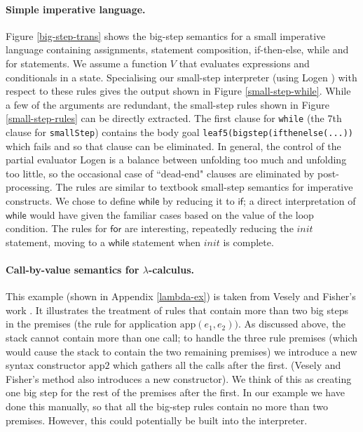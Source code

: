 \documentclass{llncs}
\newcommand{\keyword}[1]{\mathsf{#1}}
\begin{document}
\paragraph{Simple imperative language.} 
Figure \ref{big-step-trans} shows the big-step semantics for a small imperative language containing assignments, statement composition,
if-then-else, while and for statements.  We assume a function $V$ that evaluates expressions and conditionals in a state.  
Specialising our small-step interpreter (using {\sc  Logen} \cite{Logen}) with respect to these rules gives the output shown in Figure \ref{small-step-while}. 
While a few of the
arguments are redundant, the small-step rules shown in Figure \ref{small-step-rules} can be directly extracted.  The first clause for \texttt{while}
(the 7th clause for \texttt{smallStep}) contains the body goal \texttt{leaf5(bigstep(ifthenelse(...))} which fails and so that clause can be eliminated.
In general, the control of the partial evaluator {\sc  Logen}  is a balance between unfolding too much and unfolding too little, so the occasional 
case of ``dead-end" clauses
are eliminated by post-processing. The rules are similar to textbook small-step semantics for imperative constructs. 
We chose to define $\keyword{while}$ 
by reducing it to $\keyword{if}$; a direct interpretation of $\keyword{while}$ would have given the familiar cases based on the value of the loop condition. 
The rules for $\keyword{for}$ are interesting, repeatedly reducing
the $\mathit{init}$ statement, moving to a $\keyword{while}$ statement when $\mathit{init}$ is complete.  



\paragraph{Call-by-value semantics for $\lambda$-calculus.} This example (shown in Appendix \ref{lambda-ex}) is taken from Vesely and Fisher's work \cite{VeselyF19}.
It illustrates the treatment of
rules that contain more than two big steps in the premises (the rule for application $\mathrm{app}(e_1,e_2))$.  As discussed above, the stack cannot contain more
than one call;  to handle the three rule premises (which would cause the stack to contain the two remaining premises)
we introduce a new syntax constructor $\mathrm{app2}$ which gathers all the calls after the first. (Vesely and Fisher's method also introduces a new constructor).
We think of
this as creating one big step for the rest of the premises after the first. In our example we have done this manually, so that all the big-step rules contain no 
more than two 
premises.  However, this could potentially be built into the interpreter.  
\end{document}

